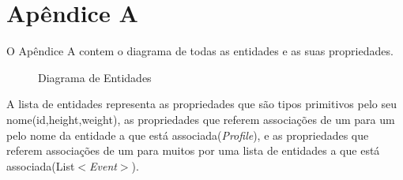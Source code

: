%
%
%
\chapter{Apêndice A} \label{ap:exemplo}
O Apêndice A contem o diagrama de todas as entidades e as suas propriedades.

\begin{figure}[h]
	\begin{center}
	\end{center}
	\caption{Diagrama de Entidades}\label{fig:}
\end{figure}



A lista de entidades representa as propriedades que são tipos primitivos pelo seu nome(id,height,weight), as propriedades que referem associações de um para um pelo nome da entidade a que está associada(\emph{Profile}), e as propriedades que referem associações de um para muitos por uma lista de entidades a que está associada(List$<$\emph{Event}$>$).


